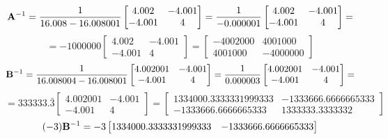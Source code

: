 \begin{enumerate}[font=\bfseries]
        \[
            \bold{A}^{-1}
            =
            \frac{1}{16.008-16.008001}
            \begin{bmatrix}
                4.002 & -4.001 \\
                -4.001 & 4
            \end{bmatrix}
            =
            \frac{1}{-0.000001}
            \begin{bmatrix}
                4.002 & -4.001 \\
                -4.001 & 4
            \end{bmatrix}
            =
        \]
        \[
            =
            -1000000
            \begin{bmatrix}
                4.002 & -4.001 \\
                -4.001 & 4
            \end{bmatrix}
            =
            \begin{bmatrix}
                -4002000 & 4001000 \\
                4001000 & -4000000
            \end{bmatrix}
        \]
        \[
            \bold{B}^{-1}
            =
            \frac{1}{16.008004-16.008001}
            \begin{bmatrix}
                4.002001 & -4.001 \\
                -4.001 & 4
            \end{bmatrix}
            =
            \frac{1}{0.000003}
            \begin{bmatrix}
                4.002001 & -4.001 \\
                -4.001 & 4
            \end{bmatrix}
            =
            \]
            \[
            =
            333333.\bar{3}
            \begin{bmatrix}
                4.002001 & -4.001 \\
                -4.001 & 4
            \end{bmatrix}
            =
            \begin{bmatrix}
                1334000.3333331999333 & -1333666.6666665333 \\
                -1333666.6666665333 & 1333333.3333332
            \end{bmatrix}
        \]
        \[
            (-3) \bold{B}^{-1}
            =
            -3
            \begin{bmatrix}
                1334000.3333331999333 & -1333666.6666665333 \\

\end{bmatrix}\]
\end{enumerate}

